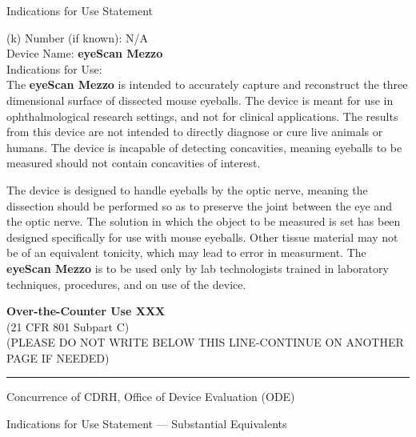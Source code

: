 \newpage
{}
\singlespacing
\begin{center}
  \large{Indications for Use Statement}
\end{center}

\onehalfspacing

(k) Number (if known): N/A \\
Device Name: \textbf{eyeScan Mezzo} \\
Indications for Use: \\

The \textbf{eyeScan Mezzo} is intended to accurately capture and
reconstruct the three dimensional surface of dissected mouse
eyeballs. The device is meant for use in ophthalmological research
settings, and not for clinical applications. The results from this
device are not intended to directly diagnose or cure live animals or
humans. The device is incapable of detecting concavities, meaning
eyeballs to be measured should not contain concavities of interest.

The device is designed to handle eyeballs by the optic nerve, meaning
the dissection should be performed so as to preserve the joint between
the eye and the optic nerve. The solution in which the object to be
measured is set has been designed specifically for use with
mouse eyeballs. Other tissue material may not be of an equivalent
tonicity, which may lead to error in measurment. The \textbf{eyeScan
  Mezzo} is to be used only by lab technologists trained in laboratory
techniques, procedures, and on use of the device.

\vfill

\noindent \textbf{Over-the-Counter Use XXX} \\
(21 CFR 801 Subpart C)\\[1em]

\noindent (PLEASE DO NOT WRITE BELOW THIS LINE-CONTINUE ON ANOTHER PAGE IF
NEEDED)

\rule{\linewidth}{0.5mm}
\begin{center}
  Concurrence of CDRH, Office of Device Evaluation (ODE)
\end{center}

\vspace{5em}

\newpage
\singlespacing
{}
\begin{center}
  \large{Indications for Use Statement --- Substantial Equivalents}
\end{center}

